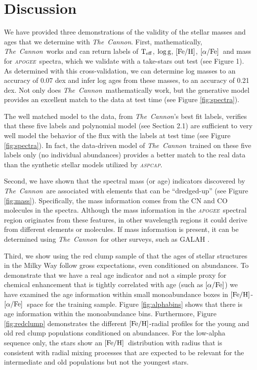 \documentclass[12pt, preprint]{aastex}
\newcommand{\project}[1]{\textsl{#1}}
\newcommand{\tc}{\project{The~Cannon}}
\newcommand{\apogee}{\project{\textsc{apogee}}}
\newcommand{\aspcap}{\project{\textsc{aspcap}}}
\newcommand{\teff}{\mbox{$\rm T_{eff}$}}
\newcommand{\feh}{\mbox{$\rm [Fe/H]$}}
\newcommand{\alphafe}{\mbox{$\rm [\alpha/Fe]$}}
\newcommand{\logg}{\mbox{$\rm \log g$}}
\begin{document}
\section{Discussion}

We have provided three demonstrations of the validity of the stellar masses and ages that we determine with \tc. First, mathematically, \tc\ works and can return labels of \teff, \logg, \feh, \alphafe\ and mass for \apogee\ spectra, which we validate with a take-stars out test (see Figure 1). As determined with this cross-validation, we can determine log masses to an accuracy of 0.07 dex and infer log ages from these masses, to an accuracy of 0.21 dex. Not only does \tc\ mathematically work, but the generative model provides an excellent match to the data at test time (see Figure \ref{fig:spectra}). 

The well matched model to the data, from \tc's best fit labels, verifies that these five labels and polynomial model (see Section 2.1) are sufficient to very well model the behavior of the flux with the labels at test time (see Figure \ref{fig:spectra}).  In fact, the data-driven model of \tc\ trained on these five labels only (no individual abundances) provides a better match to the real data than the synthetic stellar models utilized by \aspcap.




Second, we have shown that the spectral mass (or age) indicators discovered by \tc\ are associated with elements that can be ``dredged-up'' (see Figure \ref{fig:mass}). Specifically, the mass information comes from the CN and CO molecules in the spectra.  Although the mass information in the \apogee\ spectral region originates from these features, in other wavelength regions it could derive from different elements or molecules. If mass information is present, it can be determined using \tc\ for other surveys, such as GALAH \citep{Freeman2012}. 


Third, we show using the red clump sample of \citet{Bovy2014} that the ages of stellar structures in the Milky Way follow gross expectations, even conditioned on abundances. To demonstrate that we have a real age indicator and not a simple proxy for chemical enhancement that is tightly correlated with age (such as \alphafe) we have examined the age information within small monoabundance boxes in \feh-\alphafe\ space for the training sample. Figure \ref{fig:alphabins} shows that there is age information within the monoabundance bins. Furthermore, Figure \ref{fig:redclump} demonstrates the different \feh-radial profiles for the young and old red clump populations conditioned on abundances. For the low-alpha sequence only, the stars show an \feh\ distribution with radius that is consistent with radial mixing processes that are expected to be relevant for the intermediate and old populations but not the youngest stars.
\end{document}
